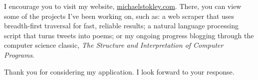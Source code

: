 \documentclass[10pt,a4paper,sans]{moderncv}        %
\begin{document}
I encourage you to visit my website,
{\href{http://michaelstokley.com}{michaelstokley.com}}. There, you can view some
of the projects I've been working on, such as: a web scraper that uses
breadth-first traversal for fast, reliable results; a natural language
processing script that turns tweets into poems; or my ongoing progress blogging
through the computer science classic, \textit{The Structure and Interpretation
  of Computer Programs}.

Thank you for considering my application. I look forward to your response.

\makeletterclosing
\end{document}
